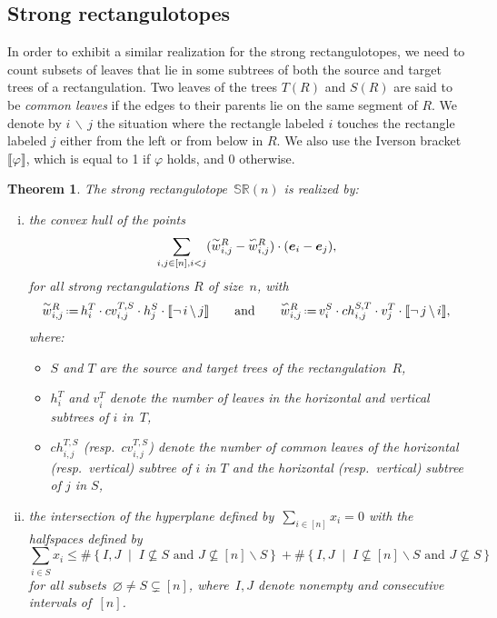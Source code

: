 \documentclass{amsart}
\newtheorem{theorem}{Theorem}%
\theoremstyle{definition}
\renewcommand{\b}[1]{{\boldsymbol{#1}}} %
\newcommand{\set}[2]{\left\{ #1 \;\middle|\; #2 \right\}} %
\newcommand{\ssm}{\smallsetminus} %
\newcommand{\eqdef}{\mbox{\,\raisebox{0.2ex}{\scriptsize\ensuremath{\mathrm:}}\ensuremath{=}\,}} %
\newcommand{\darkblue}{\color{darkblue}} %
\newcommand{\defn}[1]{\textsl{\darkblue #1}} %
\newcommand{\polytope}[1]{\mathds{#1}} %
\newcommand{\SRP}{\polytope{SR}} %
\newcommand{\yin}[1]{\smash{\overset{\sim}{#1}}}
\newcommand{\yang}[1]{\smash{\overset{\backsim}{#1}}}
\begin{document}

\subsection{Strong rectangulotopes}
\label{subsec:strongRectangulotopes}

In order to exhibit a similar realization for the strong rectangulotopes, we need to count subsets of leaves that lie in some subtrees of both the source and target trees of a rectangulation.
Two leaves of the trees $T(R)$ and $S(R)$ are said to be \defn{common leaves} if the edges to their parents lie on the same segment of $R$.
We denote by $i \, \backslash \, j$ the situation where the rectangle labeled $i$ touches the rectangle labeled $j$ either from the left or from below in $R$.
We also use the Iverson bracket $\llbracket \varphi\rrbracket$, which is equal to 1 if $\varphi$ holds, and 0 otherwise.

\begin{theorem}
\label{thm:strongRectangulotope}
The strong rectangulotope~$\SRP (n)$ is realized by:
  \begin{enumerate}[(i)]
  \item the convex hull of the points
  \[
  \sum_{i,j\in [n], i< j} (\yin{w}^R_{i,j} - \yang{w}^R_{i,j})\cdot (\b{e}_i - \b{e}_j),
  \]
   for all strong rectangulations $R$ of size~$n$, with
  \[
    \yin{w}^R_{i,j} \eqdef h^T_i \cdot cv^{T,S}_{i,j}\cdot h^S_ j\cdot \llbracket \neg \, i \, \backslash \, j \rrbracket
    \qquad\text{and}\qquad
    \yang{w}^R_{i,j} \eqdef v^S_i \cdot ch^{S,T}_{i,j}\cdot v^T_j \cdot \llbracket \neg \, j \, \backslash \, i \rrbracket,
  \]
 where:
  \begin{itemize}
  \item $S$ and $T$ are the source and target trees of the rectangulation~$R$,
  \item $h^T_i$ and $v^T_i$ denote the number of leaves in the horizontal and vertical subtrees of $i$ in~$T$,
  \item $ch^{T,S}_{i,j}$ (resp.~$cv^{T,S}_{i,j}$) denote the number of common leaves of the horizontal (resp.~vertical) subtree of $i$ in $T$ and the horizontal (resp.~vertical) subtree of $j$ in $S$,
  \end{itemize}
\item the intersection of the hyperplane defined by~$\sum_{i \in [n]} x_i = 0$ with the halfspaces defined by
  \[
  \sum_{i \in S} x_i \le \#\set{I,J}{I \not\subseteq S \text{ and } J \not\subseteq [n] \ssm S} + \#\set{I,J}{I \not\subseteq [n] \ssm S \text{ and } J \not\subseteq S}
  \]
  for all subsets~$\varnothing \ne S \subsetneq [n]$, where~$I,J$ denote nonempty and consecutive intervals of~$[n]$.
  \end{enumerate}
\end{theorem}
\end{document}
